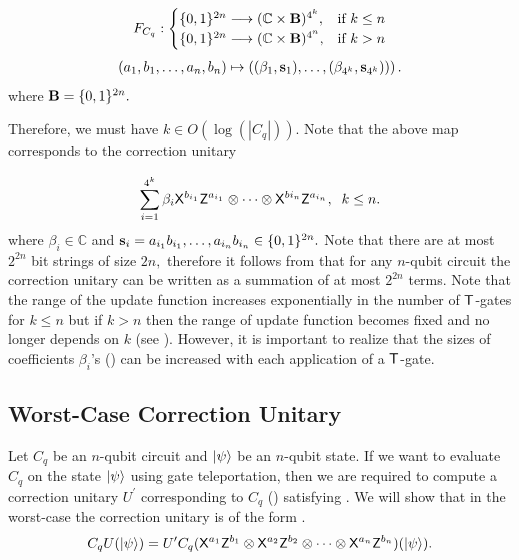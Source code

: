 \begin{equation}
\label{nqubit:eq0}
\begin{aligned}
 F_{C_q}:
\begin{cases}
    \{0,1\}^{2n}\longrightarrow  (\mathbb{C} \times {\bf B})^{4^k},& \text{if } k\leq n\\
     \{0,1\}^{2n}\longrightarrow  (\mathbb{C} \times {\bf B})^{4^n}, & \text{if } k> n\\
\end{cases}
\end{aligned}
\end{equation}
\begin{equation}
\begin{aligned}
 (a_1,b_1,\ldots, a_n,b_n) \mapsto \left((\beta_1, {\bf s}_1),\dots, (\beta_{4^k}, {\bf s}_{4^k}))\right).
\end{aligned}
\end{equation}
where  ${\bf B}=\{0,1\}^{2n}.$

Therefore, we must have $k\in O(\log(|C_q|)).$ Note that the above map corresponds to the correction unitary 



 \begin{equation}
\label{exp:nqubit-correction}
\sum_{i=1}^{4^k} \beta_i {\sf X}^{b_{i_1}} {\sf Z}^{a_{i_1}}\otimes \cdots \otimes {\sf X}^{b{i_n}} {\sf Z}^{a_{i_n}},\;  \; k\leq n.
\end{equation}
where $\beta_i\in\mathbb{C}$ and ${\bf s}_i=a_{i_1}b_{i_1}, \ldots, a_{i_n}b_{i_n} \in\{0,1\}^{2n}.$  Note that there are at most $2^{2n}$ bit strings of size $2n,$ therefore it follows from  that for any $n$-qubit circuit the correction unitary can be written as a summation of at most $2^{2n}$ terms. Note that the range of the update function increases exponentially in the number of ${\sf T}$-gates for $k\leq n$ but if $k>n$ then the range of update function becomes fixed and no longer depends on $k$ (see ). However, it is important to realize that the sizes of coefficients $\beta_i$'s () can be increased with each application of a ${\sf T}$-gate.

\subsection{Worst-Case Correction Unitary}
Let $C_q$ be an $n$-qubit circuit and ${\lvert}\psi\rangle$ be an $n$-qubit state. If we want to evaluate $C_q$ on the state ${\lvert}\psi\rangle$ using gate teleportation, then we are required to compute a correction unitary $U^\prime$ corresponding to $C_q$ () satisfying . We will show that in the worst-case the correction unitary is of the form . 
\begin{equation}
\label{nqubit:eq6}
C_qU({\lvert}\psi\rangle)= U^\prime C_q ({\sf X}^{a_{1}}{\sf Z}^{b_{1}}\otimes {\sf X}^{a_{2}}{\sf Z}^{b_{2}}\otimes \cdots \otimes {\sf X}^{a_{n}}{\sf Z}^{b_{n}})({\lvert}\psi\rangle).
\end{equation}


